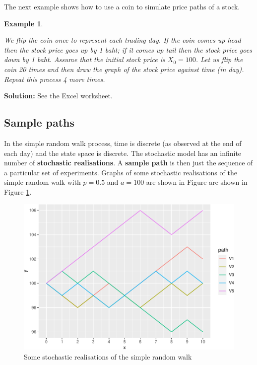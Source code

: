 \documentclass[landscape, 20pt]{extreport}
\theoremstyle{definition}
\theoremstyle{definition}
\newtheorem{example}{Example}[chapter]
\theoremstyle{definition}
\theoremstyle{definition}
\theoremstyle{remark}
\begin{document}
The next example shows how to use a coin to simulate price paths of a
stock.

\newpage \begin{example}
\protect\hypertarget{exm:unlabeled-div-64}{}\label{exm:unlabeled-div-64}

\emph{We flip the coin once to represent each trading day.
If the coin comes up head then the stock price goes up by 1 baht; if it
comes up tail then the stock price goes down by 1 baht. Assume that the
initial stock price is \(X_0 = 100\). Let us flip the coin 20 times and
then draw the graph of the stock price against time (in day). Repeat
this process 4 more times.}

\end{example}

\textbf{Solution:} See the Excel worksheet.

\hypertarget{sample-paths}{%
\subsection{Sample paths}\label{sample-paths}}

In the simple random walk process, time is discrete (as observed at the
end of each day) and the state space is discrete. The stochastic model
has an infinite number of \textbf{stochastic realisations}. A \textbf{sample path}
is then just the sequence of a particular set of experiments. Graphs of
some stochastic realisations of the simple random walk with \(p = 0.5\)
and \(a = 100\) are shown in Figure are shown in Figure \ref{fig:FigRW}.

\begin{figure}
\centering
\includegraphics{FigRW-1.pdf}
\caption{\label{fig:FigRW}Some stochastic realisations of the simple random walk}
\end{figure}
\end{document}
